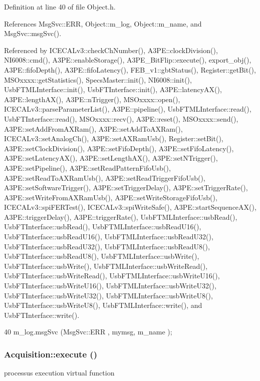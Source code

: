 Definition at line 40 of file Object.h.

References MsgSvc::ERR, Object::m\_\-log, Object::m\_\-name, and MsgSvc::msgSvc().

Referenced by ICECALv3::checkChNumber(), A3PE::clockDivision(), NI6008::cmd(), A3PE::enableStorage(), A3PE\_\-BitFlip::execute(), export\_\-obj(), A3PE::fifoDepth(), A3PE::fifoLatency(), FEB\_\-v1::gbtStatus(), Register::getBit(), MSOxxxx::getStatistics(), SpecsMaster::init(), NI6008::init(), UsbFTMLInterface::init(), UsbFTInterface::init(), A3PE::latencyAX(), A3PE::lengthAX(), A3PE::nTrigger(), MSOxxxx::open(), ICECALv3::parseParameterList(), A3PE::pipeline(), UsbFTMLInterface::read(), UsbFTInterface::read(), MSOxxxx::recv(), A3PE::reset(), MSOxxxx::send(), A3PE::setAddFromAXRam(), A3PE::setAddToAXRam(), ICECALv3::setAnalogCh(), A3PE::setAXRamUsb(), Register::setBit(), A3PE::setClockDivision(), A3PE::setFifoDepth(), A3PE::setFifoLatency(), A3PE::setLatencyAX(), A3PE::setLengthAX(), A3PE::setNTrigger(), A3PE::setPipeline(), A3PE::setReadPatternFifoUsb(), A3PE::setReadToAXRamUsb(), A3PE::setReadTriggerFifoUsb(), A3PE::setSoftwareTrigger(), A3PE::setTriggerDelay(), A3PE::setTriggerRate(), A3PE::setWriteFromAXRamUsb(), A3PE::setWriteStorageFifoUsb(), ICECALv3::spiFERTest(), ICECALv3::spiWriteSafe(), A3PE::startSequenceAX(), A3PE::triggerDelay(), A3PE::triggerRate(), UsbFTMLInterface::usbRead(), UsbFTInterface::usbRead(), UsbFTMLInterface::usbReadU16(), UsbFTInterface::usbReadU16(), UsbFTMLInterface::usbReadU32(), UsbFTInterface::usbReadU32(), UsbFTMLInterface::usbReadU8(), UsbFTInterface::usbReadU8(), UsbFTMLInterface::usbWrite(), UsbFTInterface::usbWrite(), UsbFTMLInterface::usbWriteRead(), UsbFTInterface::usbWriteRead(), UsbFTMLInterface::usbWriteU16(), UsbFTInterface::usbWriteU16(), UsbFTMLInterface::usbWriteU32(), UsbFTInterface::usbWriteU32(), UsbFTMLInterface::usbWriteU8(), UsbFTInterface::usbWriteU8(), UsbFTMLInterface::write(), and UsbFTInterface::write().


\begin{DoxyCode}
40 { m_log.msgSvc (MsgSvc::ERR     , mymsg, m_name ); }
\end{DoxyCode}
\hypertarget{classAcquisition_ae3b63064bee1b042914b63ae4135cbd8}{
\subsubsection[{execute}]{ Acquisition::execute ()}}
\label{classAcquisition_ae3b63064bee1b042914b63ae4135cbd8}
processus execution virtual function 

